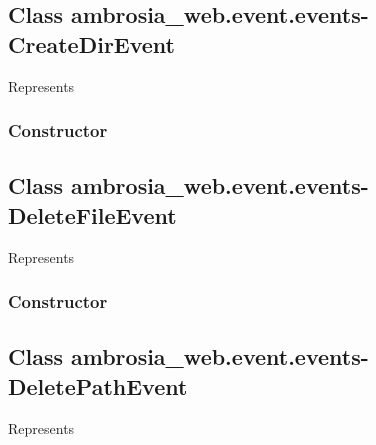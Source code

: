 \documentclass[letterpaper,10pt,english]{sphinxmanual}
\begin{document}
\subsection{Class ambrosia\_web.event.events-CreateDirEvent}
\label{ambrosia_web.event.events-CreateDirEvent:class-ambrosia-web-event-events-createdirevent}\label{ambrosia_web.event.events-CreateDirEvent::doc}
Represents {\hyperref[ambrosia_plugins.lkm:ambrosia_plugins.lkm.events.CreateDirEvent]{}}


\subsubsection{Constructor}
\label{ambrosia_web.event.events-CreateDirEvent:constructor}

\begin{fulllineitems}
\label{ambrosia_web.event.events-CreateDirEvent:ambrosia_web.event.events-CreateDirEvent}
\end{fulllineitems}



\subsection{Class ambrosia\_web.event.events-DeleteFileEvent}
\label{ambrosia_web.event.events-DeleteFileEvent:class-ambrosia-web-event-events-deletefileevent}\label{ambrosia_web.event.events-DeleteFileEvent::doc}
Represents 


\subsubsection{Constructor}
\label{ambrosia_web.event.events-DeleteFileEvent:constructor}

\begin{fulllineitems}
\label{ambrosia_web.event.events-DeleteFileEvent:ambrosia_web.event.events-DeleteFileEvent}
\end{fulllineitems}



\subsection{Class ambrosia\_web.event.events-DeletePathEvent}
\label{ambrosia_web.event.events-DeletePathEvent:class-ambrosia-web-event-events-deletepathevent}\label{ambrosia_web.event.events-DeletePathEvent::doc}
Represents {\hyperref[ambrosia_plugins.lkm:ambrosia_plugins.lkm.events.DeletePathEvent]{}}
\end{document}

